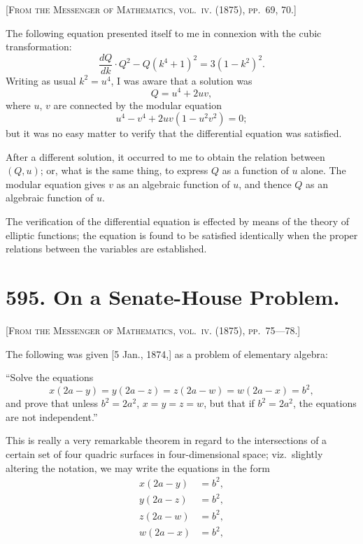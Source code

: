 \documentclass[11pt,a4paper]{article}
\theoremstyle{plain}
\theoremstyle{definition}
\theoremstyle{remark}
\begin{document}
\noindent\textsc{[From the Messenger of Mathematics, vol.~\textsc{iv}. (1875), pp.~69, 70.]}

\medskip

\noindent The following equation presented itself to me in connexion with the cubic transformation:
\[
\frac{dQ}{dk} \cdot Q^2 - Q(k^4 + 1)^2 = 3(1 - k^2)^2.
\]
Writing as usual $k^2 = u^4$, I was aware that a solution was
\[
Q = u^4 + 2uv,
\]
where $u$, $v$ are connected by the modular equation
\[
u^4 - v^4 + 2uv(1 - u^2 v^2) = 0;
\]
but it was no easy matter to verify that the differential equation was satisfied.

After a different solution, it occurred to me to obtain the relation between $(Q, u)$; or, what is the same thing, to express $Q$ as a function of $u$ alone. The modular equation gives $v$ as an algebraic function of $u$, and thence $Q$ as an algebraic function of $u$.

The verification of the differential equation is effected by means of the theory of elliptic functions; the equation is found to be satisfied identically when the proper relations between the variables are established.

\newpage

\section*{595. On a Senate-House Problem.}

\noindent\textsc{[From the Messenger of Mathematics, vol.~\textsc{iv}. (1875), pp.~75---78.]}

\medskip

\noindent The following was given [5 Jan., 1874,] as a problem of elementary algebra:

``Solve the equations
\[
x(2a - y) = y(2a - z) = z(2a - w) = w(2a - x) = b^2,
\]
and prove that unless $b^2 = 2a^2$, $x = y = z = w$, but that if $b^2 = 2a^2$, the equations are not independent.''

This is really a very remarkable theorem in regard to the intersections of a certain set of four quadric surfaces in four-dimensional space; viz.\ slightly altering the notation, we may write the equations in the form
\begin{align*}
x(2a - y) &= b^2, \tag{1} \\
y(2a - z) &= b^2, \tag{2} \\
z(2a - w) &= b^2, \tag{3} \\
w(2a - x) &= b^2, \tag{4}
\end{align*}
\end{document}
